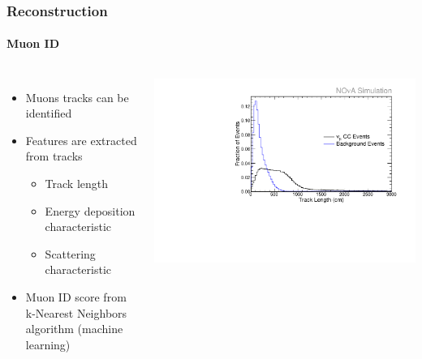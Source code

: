 \documentclass[10pt,professionalfonts,xcolor=table]{beamer}
\begin{document}
\begin{frame}

\frametitle{Reconstruction}
\framesubtitle{Muon ID}
\begin{columns}[c]
  \begin{itemize}
  \item Muons tracks can be identified
  \gap
  \item Features are extracted from tracks
    \begin{itemize}
    \item Track length
    \item Energy deposition characteristic
    \item Scattering characteristic
    \end{itemize}
  \gap
  \item Muon ID score from k-Nearest Neighbors algorithm (machine learning)
  \end{itemize}

\centering

\includegraphics[height=\textwidth, angle=-90]{figures/plots/reco/remid_trk_len.pdf}


\end{columns}
\end{frame}
\end{document}
